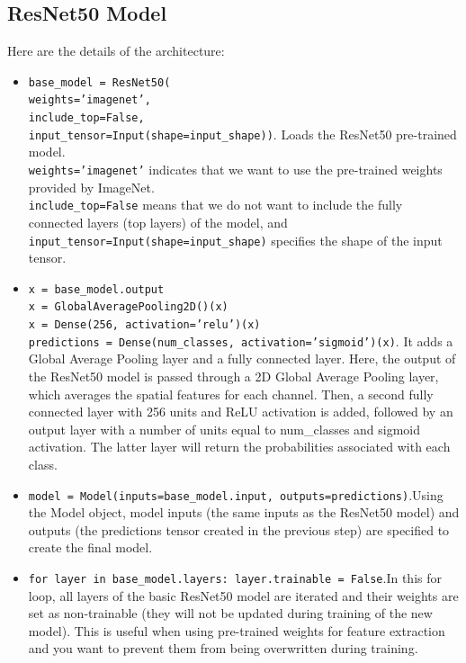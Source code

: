 \subsection{ResNet50 Model}
Here are the details of the architecture:
\begin{itemize}
\item \texttt{base\_model = ResNet50(} \\
    \texttt{weights='imagenet',} \\
    \texttt{include\_top=False,} \\
    \texttt{input\_tensor=Input(shape=input\_shape))}. Loads the ResNet50 pre-trained model.\\ 
 	\texttt{weights='imagenet'} indicates that we want to use the pre-trained weights provided by ImageNet.\\
  \texttt{include\_top=False} means that we do not want to include the fully connected layers (top layers) of the model, and \\
   \texttt{input\_tensor=Input(shape=input\_shape)} specifies the shape of the input tensor.
\item \texttt{x = base\_model.output}\\
\texttt{x = GlobalAveragePooling2D()(x)} \\
\texttt{x = Dense(256, activation='relu')(x)} \\
\texttt{predictions = Dense(num\_classes, activation='sigmoid')(x)}. It adds a Global Average Pooling layer and a fully connected layer. Here, the output of the ResNet50 model is passed through a 2D Global Average Pooling layer, which averages the spatial features for each channel. Then, a second fully connected layer with 256 units and ReLU activation is added, followed by an output layer with a number of units equal to num\_classes and sigmoid activation. The latter layer will return the probabilities associated with each class.
\item \texttt{model = Model(inputs=base\_model.input, outputs=predictions)}.Using the Model object, model inputs (the same inputs as the ResNet50 model) and outputs (the predictions tensor created in the previous step) are specified to create the final model.
\item \texttt{for layer in base\_model.layers: layer.trainable = False}.In this for loop, all layers of the basic ResNet50 model are iterated and their weights are set as non-trainable (they will not be updated during training of the new model). This is useful when using pre-trained weights for feature extraction and you want to prevent them from being overwritten during training.
\end{itemize}
